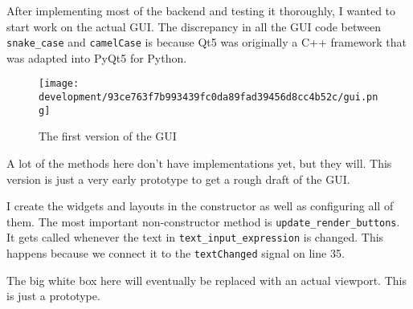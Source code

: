 \documentclass[../main.tex]{subfiles}
\begin{document}
After implementing most of the backend and testing it thoroughly, I wanted to start work on the actual GUI. The discrepancy in all the GUI code between \texttt{snake\_case} and \texttt{camelCase} is because Qt5 was originally a C++ framework that was adapted into PyQt5 for Python.


\begin{wrapfigure}{L}{0.5\linewidth}
	\vspace{-1em}
	\centering
	\texttt{[image: development/93ce763f7b993439fc0da89fad39456d8cc4b52c/gui.png]}
	\caption{The first version of the GUI}
	\label{fig:development:93ce763f7b993439fc0da89fad39456d8cc4b52c:gui.png}
\end{wrapfigure}

A lot of the methods here don't have implementations yet, but they will. This version is just a very early prototype to get a rough draft of the GUI.

I create the widgets and layouts in the constructor as well as configuring all of them. The most important non-constructor method is \texttt{update\_render\_buttons}. It gets called whenever the text in \texttt{text\_input\_expression} is changed. This happens because we connect it to the \texttt{textChanged} signal on line 35.

The big white box here will eventually be replaced with an actual viewport. This is just a prototype.
\end{document}
